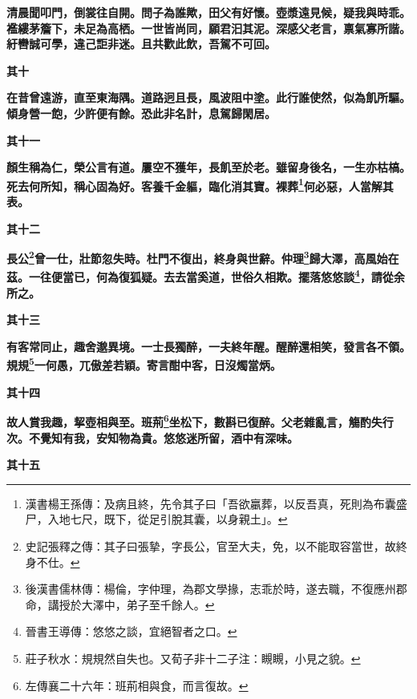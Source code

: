 \textbf{清晨聞叩門，倒裳往自開。問子為誰歟，田父有好懷。壺漿遠見候，疑我與時乖。襤縷茅簷下，未足為高栖。一世皆尚同，願君汩其泥。深感父老言，禀氣寡所諧。紆轡誠可學，違己詎非迷。且共歡此飲，吾駕不可回。}

\begin{quoting}\textbf{其十}\end{quoting}

\textbf{在昔曾遠游，直至東海隅。道路迥且長，風波阻中塗。此行誰使然，似為飢所驅。傾身營一飽，少許便有餘。恐此非名計，息駕歸閑居。}

\begin{quoting}\textbf{其十一}\end{quoting}

\textbf{顏生稱為仁，榮公言有道。屢空不獲年，長飢至於老。雖留身後名，一生亦枯槁。死去何所知，稱心固為好。客養千金軀，臨化消其寶。裸葬\footnote{漢書楊王孫傳：及病且終，先令其子曰「吾欲臝葬，以反吾真，死則為布囊盛尸，入地七尺，既下，從足引脫其囊，以身親土」。}何必惡，人當解其表。}

\begin{quoting}\textbf{其十二}\end{quoting}

\textbf{長公\footnote{史記張釋之傳：其子曰張摯，字長公，官至大夫，免，以不能取容當世，故終身不仕。}曾一仕，壯節忽失時。杜門不復出，終身與世辭。仲理\footnote{後漢書儒林傳：楊倫，字仲理，為郡文學掾，志乖於時，遂去職，不復應州郡命，講授於大澤中，弟子至千餘人。}歸大澤，高風始在茲。一往便當已，何為復狐疑。去去當奚道，世俗久相欺。擺落悠悠談\footnote{晉書王導傳：悠悠之談，宜絕智者之口。}，請從余所之。}

\begin{quoting}\textbf{其十三}\end{quoting}

\textbf{有客常同止，趣舍邈異境。一士長獨醉，一夫終年醒。醒醉還相笑，發言各不領。規規\footnote{莊子秋水：規規然自失也。又荀子非十二子注：瞡瞡，小見之貌。}一何愚，兀傲差若穎。寄言酣中客，日沒燭當炳。}

\begin{quoting}\textbf{其十四}\end{quoting}

\textbf{故人賞我趣，挈壺相與至。班荊\footnote{左傳襄二十六年：班荊相與食，而言復故。}坐松下，數斟已復醉。父老雜亂言，觴酌失行次。不覺知有我，安知物為貴。悠悠迷所留，酒中有深味。}

\begin{quoting}\textbf{其十五}\end{quoting}

